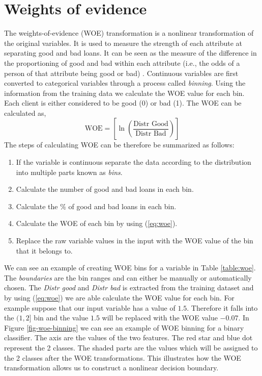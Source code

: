 \section{Weights of evidence}
 The weights-of-evidence (WOE) transformation \cite{Siddiqi2005CreditRS} is a nonlinear transformation of the original variables. It is used to measure the strength of each attribute at separating good and bad loans. It can be seen as the measure of the difference in the proportioning of good and bad within each attribute (i.e., the odds of a person of that attribute being good or bad) \cite{Siddiqi2005CreditRS}.  Continuous variables are first converted to categorical variables through a process called \emph{binning}. Using the information from the training data we calculate the WOE value for each bin. Each client is either considered to be good (0) or bad (1).
 The WOE can be calculated as,
  \begin{equation}
     \mbox{WOE} = \left[ \ln{\left(\frac{\mbox{Distr Good}}{\mbox{Distr Bad}}\right)} \right] 
     \label{eq:woe}
 \end{equation}
The steps of calculating WOE can be therefore be summarized as follows:
\begin{enumerate}
    \item If the variable is continuous separate the data according to the distribution into multiple parts known as \emph{bins}.
    \item Calculate the number of good and bad loans in each bin.
    \item Calculate the $\%$ of good and bad loans in each bin. 
    \item Calculate the WOE of each bin by using (\ref{eq:woe}).
    \item Replace the raw variable values in the input with the WOE value of the bin that it belongs to.
\end{enumerate}
We can see an example of creating WOE bins for a variable  in Table \ref{table:woe}. The \emph{boundaries} are the bin ranges and can either be manually or automatically chosen. The \emph{Distr good} and \emph{Distr bad} is extracted from the training dataset and by using (\ref{eq:woe}) we are able calculate the WOE value for each bin. For example suppose that our input variable has a value of $1.5$. Therefore it falls into the $(1,2]$ bin and the value $1.5$ will be replaced with the WOE value $-0.07$. In Figure \ref{fig-woe-binning} we can see an example of WOE binning for a binary classifier. The axis are the values of the two features. The red star and blue dot represent the 2 classes. The shaded parts are the values which will be assigned to the 2 classes after the WOE transformations. This illustrates how the WOE transformation allows us to construct a nonlinear decision boundary.

